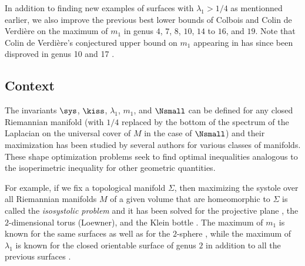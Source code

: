 \documentclass[12pt]{amsart}
\numberwithin{equation}{section}
\begin{document}
In addition to finding new examples of surfaces with $\lambda_1 > 1/4$ as mentionned earlier, we also improve the previous best lower bounds of Colbois and Colin de Verdière \cite{CCV} on the maximum of $m_1$ in genus $4$, $7$, $8$, $10$, $14$ to $16$, and $19$. Note that Colin de Verdière's conjectured upper bound \cite{CdV86,CdV} on $m_1$ appearing in  has since been disproved in genus 10 and 17 \cite{counterexamples}.

\subsection*{Context}

The invariants $\sys$, $\kiss$, $\lambda_1$, $m_1$, and $\Nsmall$ can be defined for any closed Riemannian manifold (with $1/4$ replaced by the bottom of the spectrum of the Laplacian on the universal cover of $M$ in the case of $\Nsmall$) and their ma\-xi\-mization has been studied by several authors for va\-rious classes of manifolds. These shape optimization problems seek to find optimal inequalities analogous to the isoperimetric inequality for other geometric quantities.

For example, if we fix a topological manifold $\Sigma$, then maximizing the systole over all Rieman\-nian manifolds $M$ of a given volume that are homeomorphic to $\Sigma$ is called the \emph{isosystolic problem} and it has been solved for the projective plane \cite{Pu}, the $2$-dimensional torus (Loewner), and the Klein bottle \cite{BavardKlein}. The maximum of $m_1$ is known for the same surfaces \cite{Besson,CdV,NadirashviliMultiplicite} as well as for the $2$-sphere \cite{Cheng}, while the maximum of $\lambda_1$ is known for the closed orientable surface of genus $2$ \cite{Jakobson,NayataniShoda} in addition to all the previous surfaces \cite{Hersch,LiYau,Nadirashvili,ElSoufi}. 
\end{document}
